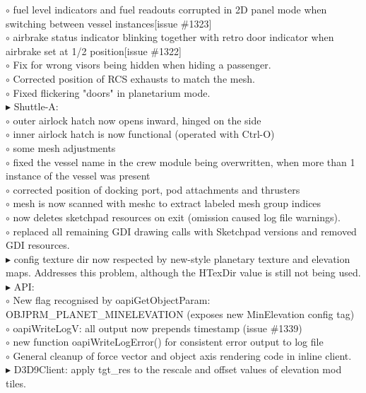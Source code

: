 \documentclass[Orbiter User Manual.tex]{subfiles}
\begin{document}
$\circ$ fuel level indicators and fuel readouts corrupted in 2D panel mode when switching between vessel instances[issue \#1323]\\
$\circ$ airbrake status indicator blinking together with retro door indicator when airbrake set at 1/2 position[issue \#1322]\\
$\circ$ Fix for wrong visors being hidden when hiding a passenger.\\
$\circ$ Corrected position of RCS exhausts to match the mesh.\\
$\circ$ Fixed flickering "doors" in planetarium mode.\\
$\blacktriangleright$ Shuttle-A:\\
$\circ$ outer airlock hatch now opens inward, hinged on the side\\
$\circ$ inner airlock hatch is now functional (operated with Ctrl-O)\\
$\circ$ some mesh adjustments\\
$\circ$ fixed the vessel name in the crew module being overwritten, when more than 1 instance of the vessel was present\\
$\circ$ corrected position of docking port, pod attachments and thrusters\\
$\circ$ mesh is now scanned with meshc to extract labeled mesh group indices\\
$\circ$ now deletes sketchpad resources on exit (omission caused log file warnings).\\
$\circ$ replaced all remaining GDI drawing calls with Sketchpad versions and removed GDI resources.\\
$\blacktriangleright$ config texture dir now respected by new-style planetary texture and elevation maps. Addresses this problem, although the HTexDir value is still not being used.\\
$\blacktriangleright$ API:\\
$\circ$ New flag recognised by oapiGetObjectParam: OBJPRM\_PLANET\_MINELEVATION (exposes new MinElevation config tag)\\
$\circ$ oapiWriteLogV: all output now prepends timestamp (issue \#1339)\\
$\circ$ new function oapiWriteLogError() for consistent error output to log file\\
$\circ$ General cleanup of force vector and object axis rendering code in inline client.\\
$\blacktriangleright$ D3D9Client: apply tgt\_res to the rescale and offset values of elevation mod tiles.\\
\end{document}

